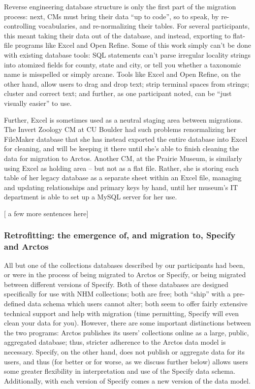 Reverse engineering database structure is only the first part of the migration process: next, CMs must bring their data “up to code”, so to speak, by re-controlling vocabularies, and re-normalizing their tables. For several participants, this meant taking their data out of the database, and instead, exporting to flat-file programs like Excel and Open Refine. Some of this work simply can’t be done with existing database tools: SQL statements can’t parse irregular locality strings into atomized fields for county, state and city, or tell you whether a taxonomic name is misspelled or simply arcane.  Tools like Excel and Open Refine, on the other hand, allow users to drag and drop text; strip terminal spaces from strings; cluster and correct text; and further, as one participant noted, can be “just visually easier” to use. 

Further, Excel is sometimes used as a neutral staging area between migrations. The Invert Zoology CM at CU Boulder had such problems renormalizing her FileMaker database that she has instead exported the entire database into Excel for cleaning, and will be keeping it there until she’s able to finish cleaning the data for migration to Arctos.  Another CM, at the Prairie Museum, is similarly using Excel as holding area – but not as a flat file.  Rather, she is storing each table of her legacy database as a separate sheet within an Excel file, managing and updating relationships and primary keys by hand, until her museum’s IT department is able to set up a MySQL server for her use.

[ a few more sentences here]

\subsubsection{Retrofitting: the emergence of, and migration to, Specify and Arctos}

All but one of the collections databases described by our participants had been, or were in the process of being migrated to Arctos or Specify, or being migrated between different versions of Specify. Both of these databases are designed specifically for use with NHM collections; both are free; both “ship” with a pre-defined data schema which users cannot alter; both seem to offer fairly extensive technical support and help with migration (time permitting, Specify will even clean your data for you). However, there are some important distinctions between the two programs: Arctos publishes its users’ collections online as a large, public, aggregated database; thus, stricter adherence to the Arctos data model is necessary. Specify, on the other hand, does not publish or aggregate data for its users, and thus (for better or for worse, as we discuss further below) allows users some greater flexibility in interpretation and use of the Specify data schema.  Additionally, with each version of Specify comes a new version of the data model.

